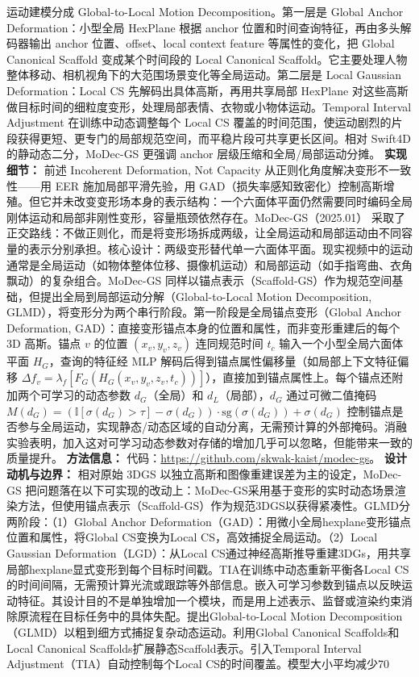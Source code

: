 运动建模分成 Global-to-Local Motion Decomposition。第一层是 Global Anchor Deformation：小型全局 HexPlane 根据 anchor 位置和时间查询特征，再由多头解码器输出 anchor 位置、offset、local context feature 等属性的变化，把 Global Canonical Scaffold 变成某个时间段的 Local Canonical Scaffold。它主要处理人物整体移动、相机视角下的大范围场景变化等全局运动。第二层是 Local Gaussian Deformation：Local CS 先解码出具体高斯，再用共享局部 HexPlane 对这些高斯做目标时间的细粒度变形，处理局部表情、衣物或小物体运动。Temporal Interval Adjustment 在训练中动态调整每个 Local CS 覆盖的时间范围，使运动剧烈的片段获得更短、更专门的局部规范空间，而平稳片段可共享更长区间。相对 Swift4D 的静动态二分，MoDec-GS 更强调 anchor 层级压缩和全局/局部运动分摊。
\textbf{实现细节：} 前述 Incoherent Deformation, Not Capacity 从正则化角度解决变形不一致性——用 EER 施加局部平滑先验，用 GAD（损失率感知致密化）控制高斯增殖。但它并未改变变形场本身的表示结构：一个六面体平面仍然需要同时编码全局刚体运动和局部非刚性变形，容量瓶颈依然存在。MoDec-GS（2025.01） 采取了正交路线：不做正则化，而是将变形场拆成两级，让全局运动和局部运动由不同容量的表示分别承担。核心设计：两级变形替代单一六面体平面。现实视频中的运动通常是全局运动（如物体整体位移、摄像机运动）和局部运动（如手指弯曲、衣角飘动）的复杂组合。MoDec-GS 同样以锚点表示（Scaffold-GS）作为规范空间基础，但提出全局到局部运动分解（Global-to-Local Motion Decomposition, GLMD），将变形分为两个串行阶段。第一阶段是全局锚点变形（Global Anchor Deformation, GAD）：直接变形锚点本身的位置和属性，而非变形重建后的每个 3D 高斯。锚点 $v$ 的位置 $(x_v, y_v, z_v)$ 连同规范时间 $t_c$ 输入一个小型全局六面体平面 $H_G$，查询的特征经 MLP 解码后得到锚点属性偏移量（如局部上下文特征偏移 $\Delta f_v = \lambda_f[F_G(H_G(x_v, y_v, z_v, t_c))]$），直接加到锚点属性上。每个锚点还附加两个可学习的动态参数 $d_G$（全局）和 $d_L$（局部），$d_G$ 通过可微二值掩码 $M(d_G) = (\mathbb{I}[\sigma(d_G) > \tau] - \sigma(d_G)) \cdot \mathrm{sg}(\sigma(d_G)) + \sigma(d_G)$ 控制锚点是否参与全局运动，实现静态/动态区域的自动分离，无需预计算的外部掩码。消融实验表明，加入这对可学习动态参数对存储的增加几乎可以忽略，但能带来一致的质量提升。
\textbf{方法信息：} 代码：\url{https://github.com/skwak-kaist/modec-gs}。
\textbf{设计动机与边界：} 相对原始 3DGS 以独立高斯和图像重建误差为主的设定，MoDec-GS 把问题落在以下可实现的改动上：MoDec-GS采用基于变形的实时动态场景渲染方法，但使用锚点表示（Scaffold-GS）作为规范3DGS以获得紧凑性。GLMD分两阶段：（1）Global Anchor Deformation（GAD）：用微小全局hexplane变形锚点位置和属性，将Global CS变换为Local CS，高效捕捉全局运动。（2）Local Gaussian Deformation（LGD）：从Local CS通过神经高斯推导重建3DGs，用共享局部hexplane显式变形到每个目标时间戳。TIA在训练中动态重新平衡各Local CS的时间间隔，无需预计算光流或跟踪等外部信息。嵌入可学习参数到锚点以反映运动特征。其设计目的不是单独增加一个模块，而是用上述表示、监督或渲染约束消除原流程在目标任务中的具体失配。提出Global-to-Local Motion Decomposition（GLMD）以粗到细方式捕捉复杂动态运动。利用Global Canonical Scaffolds和Local Canonical Scaffolds扩展静态Scaffold表示。引入Temporal Interval Adjustment（TIA）自动控制每个Local CS的时间覆盖。模型大小平均减少70%
